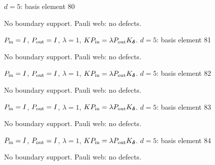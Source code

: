 {\Large $d=5$: basis element 80}\par
No boundary support. Pauli web: no defects.
\begin{center}
\end{center}
\vspace{-1mm}
$P_{\rm in}=I$, \quad $P_{\rm out}=I$, \quad $\lambda=1$, \qquad $K P_{\rm in}=\lambda P_{\rm out}K_{\boldsymbol\delta}$.
\vfill
{\footnotesize\texttt{}}
\newpage
{}
{\Large $d=5$: basis element 81}\par
No boundary support. Pauli web: no defects.
\begin{center}
\end{center}
\vspace{-1mm}
$P_{\rm in}=I$, \quad $P_{\rm out}=I$, \quad $\lambda=1$, \qquad $K P_{\rm in}=\lambda P_{\rm out}K_{\boldsymbol\delta}$.
\vfill
{\footnotesize\texttt{}}
\newpage
{}
{\Large $d=5$: basis element 82}\par
No boundary support. Pauli web: no defects.
\begin{center}
\end{center}
\vspace{-1mm}
$P_{\rm in}=I$, \quad $P_{\rm out}=I$, \quad $\lambda=1$, \qquad $K P_{\rm in}=\lambda P_{\rm out}K_{\boldsymbol\delta}$.
\vfill
{\footnotesize\texttt{}}
\newpage
{}
{\Large $d=5$: basis element 83}\par
No boundary support. Pauli web: no defects.
\begin{center}
\end{center}
\vspace{-1mm}
$P_{\rm in}=I$, \quad $P_{\rm out}=I$, \quad $\lambda=1$, \qquad $K P_{\rm in}=\lambda P_{\rm out}K_{\boldsymbol\delta}$.
\vfill
{\footnotesize\texttt{}}
\newpage
{}
{\Large $d=5$: basis element 84}\par
No boundary support. Pauli web: no defects.
\begin{center}
\end{center}
\vspace{-1mm}
